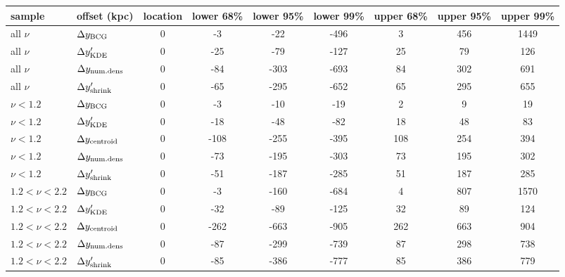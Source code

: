 \begin{tabular}{llccccccc}
\toprule
sample & offset (kpc) &  location &  lower 68\% &  lower 95\% &  lower 99\% &  upper 68\% &  upper 95\% &  upper 99\% \\
\midrule
all $\nu$ & $\Delta y_{\rm BCG}$               &         0 &          -3 &         -22 &        -496 &           3 &         456 &        1449 \\
all $\nu$ & $\Delta y_{\rm KDE}'$              &         0 &         -25 &         -79 &        -127 &          25 &          79 &         126 \\
all $\nu$ & $\Delta y_{\rm num. dens}$         &        0 &         -84 &        -303 &        -693 &          84 &         302 &         691 \\
all $\nu$ & $\Delta y_{\rm shrink}'$           &        0 &         -65 &        -295 &        -652 &          65 &         295 &         655 \\
\midrule
$\nu < 1.2$ & $\Delta y_{\rm BCG}$             &        0 &          -3 &         -10 &         -19 &           2 &           9 &          19 \\
$\nu < 1.2$ & $\Delta y_{\rm KDE}'$            &         0 &         -18 &         -48 &         -82 &          18 &          48 &          83 \\
$\nu < 1.2$ & $\Delta y_{\rm centroid}$        &        0 &        -108 &        -255 &        -395 &         108 &         254 &         394 \\
$\nu < 1.2$ & $\Delta y_{\rm num. dens}$       &        0 &         -73 &        -195 &        -303 &          73 &         195 &         302 \\
$\nu < 1.2$ & $\Delta y_{\rm shrink}'$         &         0 &         -51 &        -187 &        -285 &          51 &         187 &         285 \\
\midrule
$1.2 < \nu < 2.2$ & $\Delta y_{\rm BCG}$       &         0 &          -3 &        -160 &        -684 &           4 &         807 &        1570 \\
$1.2 < \nu < 2.2$ & $\Delta y_{\rm KDE}'$      &        0 &         -32 &         -89 &        -125 &          32 &          89 &         124 \\
$1.2 < \nu < 2.2$ & $\Delta y_{\rm centroid}$  &         0 &        -262 &        -663 &        -905 &         262 &         663 &         904 \\
$1.2 < \nu < 2.2$ & $\Delta y_{\rm num. dens}$ &         0 &         -87 &        -299 &        -739 &          87 &         298 &         738 \\
$1.2 < \nu < 2.2$ & $\Delta y_{\rm shrink}'$   &        0 &         -85 &        -386 &        -777 &          85 &         386 &         779 \\
\bottomrule
\end{tabular}
